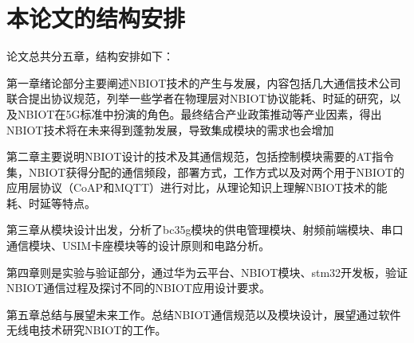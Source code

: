 \section{本论文的结构安排}

论文总共分五章，结构安排如下：

第一章绪论部分主要阐述NBIOT技术的产生与发展，内容包括几大通信技术公司联合提出协议规范，列举一些学者在物理层对NBIOT协议能耗、时延的研究，以及NBIOT在5G标准中扮演的角色。最终结合产业政策推动等产业因素，得出NBIOT技术将在未来得到蓬勃发展，导致集成模块的需求也会增加

第二章主要说明NBIOT设计的技术及其通信规范，包括控制模块需要的AT指令集，NBIOT获得分配的通信频段，部署方式，工作方式以及对两个用于NBIOT的应用层协议（CoAP和MQTT）进行对比，从理论知识上理解NBIOT技术的能耗、时延等特点。

第三章从模块设计出发，分析了bc35g模块的供电管理模块、射频前端模块、串口通信模块、USIM卡座模块等的设计原则和电路分析。

第四章则是实验与验证部分，通过华为云平台、NBIOT模块、stm32开发板，验证NBIOT通信过程及探讨不同的NBIOT应用设计要求。

第五章总结与展望未来工作。总结NBIOT通信规范以及模块设计，展望通过软件无线电技术研究NBIOT的工作。